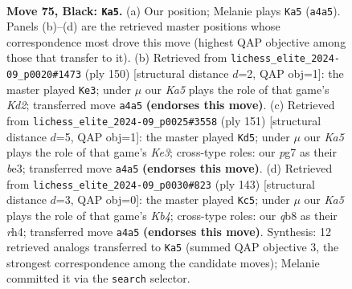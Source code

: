 \documentclass[11pt]{article}
\begin{document}
\clearpage

\begin{figure}[p]\centering
\begin{subfigure}{0.46\textwidth}\centering
\resizebox{\linewidth}{!}{%
\newchessgame
\chessboard[
  setfen={1Q6/6P1/4P3/7P/k7/8/4K3/8 b - - 8 75},
  showmover=false,
  pgfstyle=straightmove, color=movearrow, markmove={a4-a5}
]}
\caption{}
\end{subfigure}\hfill
\begin{subfigure}{0.46\textwidth}\centering
\resizebox{\linewidth}{!}{%
\newchessgame
\chessboard[
  setfen={8/p4p2/8/8/8/k7/3K4/1q6 w - - 0 76},
  showmover=false,
  pgfstyle=straightmove, color=movearrow, markmove={d2-e3}
]}
\caption{}
\end{subfigure}
\\[4pt]
\begin{subfigure}{0.46\textwidth}\centering
\resizebox{\linewidth}{!}{%
\newchessgame
\chessboard[
  setfen={5Q2/1K6/4k3/PP6/4p3/4B3/8/8 b - - 10 76},
  showmover=false,
  pgfstyle=straightmove, color=movearrow, markmove={e6-d5}
]}
\caption{}
\end{subfigure}\hfill
\begin{subfigure}{0.46\textwidth}\centering
\resizebox{\linewidth}{!}{%
\newchessgame
\chessboard[
  setfen={8/5P2/8/1k1P2P1/7R/3K4/8/8 b - - 0 72},
  showmover=false,
  pgfstyle=straightmove, color=movearrow, markmove={b5-c5}
]}
\caption{}
\end{subfigure}
\caption{\textbf{Move 75, Black: \texttt{Ka5}.} (a) Our position; Melanie plays \texttt{Ka5} (\texttt{a4a5}). Panels (b)--(d) are the retrieved master positions whose correspondence most drove this move (highest QAP objective among those that transfer to it). (b) Retrieved from \texttt{lichess\_elite\_2024-09\_p0020\#1473} (ply 150) [structural distance $d$=2, QAP obj=1]: the master played \texttt{Ke3}; under $\mu$ our \emph{Ka5} plays the role of that game's \emph{Kd2}; transferred move \texttt{a4a5} \textbf{(endorses this move)}. (c) Retrieved from \texttt{lichess\_elite\_2024-09\_p0025\#3558} (ply 151) [structural distance $d$=5, QAP obj=1]: the master played \texttt{Kd5}; under $\mu$ our \emph{Ka5} plays the role of that game's \emph{Ke3}; cross-type roles: our \emph{p}g7 as their \emph{b}e3; transferred move \texttt{a4a5} \textbf{(endorses this move)}. (d) Retrieved from \texttt{lichess\_elite\_2024-09\_p0030\#823} (ply 143) [structural distance $d$=3, QAP obj=0]: the master played \texttt{Kc5}; under $\mu$ our \emph{Ka5} plays the role of that game's \emph{Kb4}; cross-type roles: our \emph{q}b8 as their \emph{r}h4; transferred move \texttt{a4a5} \textbf{(endorses this move)}. Synthesis: 12 retrieved analogs transferred to \texttt{Ka5} (summed QAP objective 3, the strongest correspondence among the candidate moves); Melanie committed it via the \texttt{search} selector.}
\label{fig:thought-m149}
\end{figure}
\end{document}
